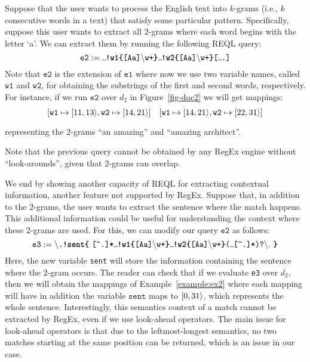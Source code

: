 \begin{example} \label{example:ex2}
	Suppose that the user wants to process the English text into $k$-grams (i.e., $k$ consecutive words in a text) that satisfy some particular pattern. Specifically, suppose this user wants to extract all $2$-grams where each word begins with the letter `a'. We can extract them by running the following REQL query:
	$$
	\texttt{e2} := \Vtextvisiblespace \texttt{\textbf{!w1\{}[Aa]}\backslash \texttt{w+\textbf{\}}}\Vtextvisiblespace \texttt{\textbf{!w2\{}[Aa]}\backslash \texttt{w+\textbf{\}}[}\Vtextvisiblespace \texttt{.]}
	$$
	Note that $\texttt{e2}$ is the extension of $\texttt{e1}$ where now we use two variable names, called $\texttt{w1}$ and $\texttt{w2}$, for obtaining the substrings of the first and second words, respectively. For instance, if we run $\texttt{e2}$ over $d_2$ in Figure~\ref{fig-doc2} we will get mappings:
	$$
	\begin{array}{cc}
		[\texttt{w1} \mapsto \Span{11}{13}, \texttt{w2} \mapsto \Span{14}{21}] & 
		{[}\texttt{w1} \mapsto \Span{14}{21}, \texttt{w2} \mapsto \Span{22}{31}] \vspace{1mm}\\
	\end{array}
	$$
	representing the $2$-grams ``an amazing'' and ``amazing architect''.%
\end{example}
Note that the previous query cannot be obtained by any RegEx engine without ``look-arounds'', given that $2$-grams can overlap. %
\begin{example}\label{example:ex3}
	We end by showing another capacity of REQL for extracting contextual information, another feature not supported by RegEx. Suppose that, in addition to the $2$-grams, the user wants to extract the sentence where the match happens. This additional information could be useful for understanding the context where these $2$-grams are used. For this, we can modify our query $\texttt{e2}$ as follows:
$$
\texttt{e3}  :=  \backslash \texttt{.}\texttt{\textbf{!sent\{}} \ \texttt{[\textasciicircum .]*} \Vtextvisiblespace \texttt{\textbf{!w1\{}[Aa]}\backslash \texttt{w+\textbf{\}}}\Vtextvisiblespace \texttt{\textbf{!w2\{}[Aa]}\backslash \texttt{w+\textbf{\}}}  \texttt{(}\Vtextvisiblespace\texttt{[\textasciicircum .]*)?}\backslash .  \ \texttt{\textbf{\}}}
$$
	Here, the new variable \texttt{sent} will store the information containing the sentence where the $2$-gram occurs. The reader can check that if we evaluate \texttt{e3} over $d_2$, then we will obtain the mappings of Example~\ref{example:ex2} where each mapping will have 
	in addition the variable $\texttt{sent}$ maps to $[0, 31\rangle$, which represents the whole sentence. Interestingly, this semantics context of a match cannot be extracted by RegEx, even if we use look-ahead operators. The main issue for look-ahead operators is that due to the leftmost-longest semantics, no two matches starting at the same position can be returned, which is an issue in our case.
\end{example}

